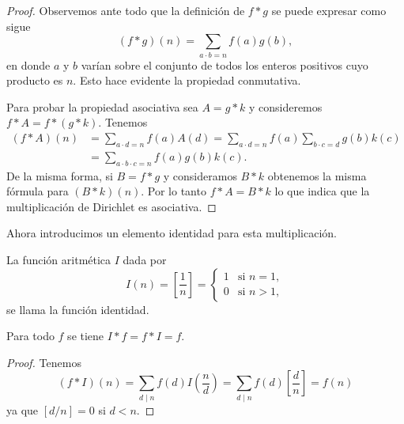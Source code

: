 \documentclass[12pt,a4paper]{book}
\begin{document}
    \begin{proof}
        Observemos ante todo que la definición de $f*g$ se puede expresar como sigue
        \begin{equation*}
            (f*g)(n)=\sum_{a\cdot b=n}f(a)g(b),
        \end{equation*}
        en donde $a$ y $b$ varían sobre el conjunto de todos los enteros positivos cuyo
        producto es $n$. Esto hace evidente la propiedad conmutativa.

        Para probar la propiedad asociativa sea $A=g*k$ y consideremos $f*A=f*(g*k)$.
        Tenemos
        \begin{align*}
            (f*A)(n)&=\sum_{a\cdot d=n}f(a)A(d)=\sum_{a\cdot d=n}f(a)\sum_{b\cdot c=d}g(b)k(c)\\
            &=\sum_{a\cdot b\cdot c=n}f(a)g(b)k(c).
        \end{align*}
        De la misma forma, si $B=f*g$ y consideramos $B*k$ obtenemos la misma fórmula para
        $(B*k)(n)$. Por lo tanto $f*A=B*k$ lo que indica que la multiplicación de Dirichlet
        es asociativa.
    \end{proof}

    Ahora introducimos un elemento identidad para esta multiplicación.

    \begin{definicion}
        La función aritmética $I$ dada por
        \begin{equation*}
            I(n)=\left[\frac{1}{n}\right]=
            \begin{cases}
                1 & \text{si } n=1,\\
                0 & \text{si } n>1,
            \end{cases}
        \end{equation*}
        se llama la función identidad.\label{sim:I}
    \end{definicion}

    \begin{teorema}
        Para todo $f$ se tiene $I*f=f*I=f$.
    \end{teorema}

    \begin{proof}
        Tenemos
        \begin{equation*}
            (f*I)(n)=\sum_{d\mid n}f(d)I\left(\frac{n}{d}\right)
            =\sum_{d\mid n}f(d)\left[\frac{d}{n}\right]=f(n)
        \end{equation*}
        ya que $[d/n]=0$ si $d<n$.
    \end{proof}
\end{document}
